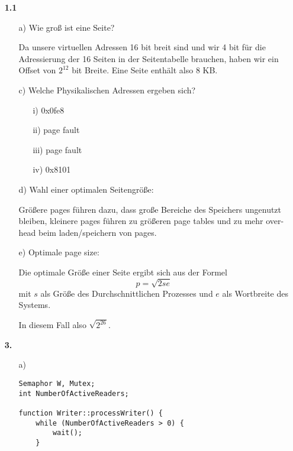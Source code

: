 \documentclass[a4paper,11pt]{article}
\author{\authorinfo}
\title{\titleinfo}
\date{\today}
\begin{document}
\maketitle


\begin{enumerate}
\item[\textbf{1.1}]

\begin{itemize}
    \item[a)] Wie groß ist eine Seite?

    Da unsere virtuellen Adressen 16 bit breit sind und wir 4 bit für die
    Adressierung der 16 Seiten in der Seitentabelle brauchen, haben wir ein
    Offset von \(2^{12}\) bit Breite.  Eine Seite enthält also 8 KB.

    \item[c)] Welche Physikalischen Adressen ergeben sich?
    \begin{enumerate}
        \item[i)] 0x0fe8
        \item[ii)] page fault
        \item[iii)] page fault
        \item[iv)] 0x8101
    \end{enumerate}

    \item[d)] Wahl einer optimalen Seitengröße:

    Größere pages führen dazu, dass große Bereiche des Speichers ungenutzt
    bleiben, kleinere pages führen zu größeren page tables und zu mehr over-
    head beim laden/speichern von pages.

    \item[e)] Optimale page size:

    Die optimale Größe einer Seite ergibt sich aus der Formel
    \[
        p = \sqrt{2 s e}
    \]
    mit \(s\) als Größe des Durchschnittlichen Prozesses und \(e\) als
    Wortbreite des Systems.

    In diesem Fall also \(\sqrt{2^{26}}\).
\end{itemize}

\item[\textbf{3.}]
\begin{itemize}
    \item[a)]
        \begin{verbatim}
Semaphor W, Mutex;
int NumberOfActiveReaders;

function Writer::processWriter() {
    while (NumberOfActiveReaders > 0) {
        wait();
    }


\end{verbatim}
\end{itemize}
\end{enumerate}
\end{document}
